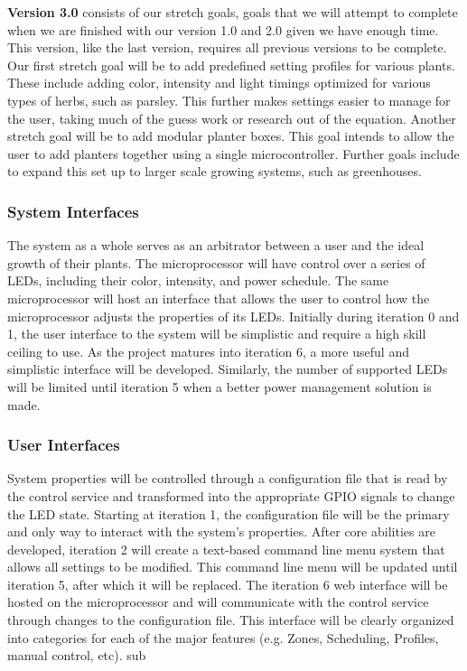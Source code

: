 \documentclass[onecolumn, draftclsnofoot,10pt, compsoc]{IEEEtran}
\begin{document}
		\noindent \textbf{Version 3.0} consists of our stretch goals, goals that we will attempt to complete when we are finished with our version 1.0 and 2.0 given we have enough time. This version, like the last version,
		requires all previous versions to be complete. Our first stretch goal will be to add predefined setting profiles for various plants. These include adding color, intensity and light timings optimized
		for various types of herbs, such as parsley. This further makes settings easier to manage for the user, taking much of the guess work or research out of the equation. Another stretch goal will be
		to add modular planter boxes. This goal intends to allow the user to add planters together using a single microcontroller. Further goals include to expand this set up to larger scale growing systems,
		such as greenhouses.


		\subsubsection*{System Interfaces}
				The system as a whole serves as an arbitrator between a user and the ideal growth of their plants.
				The microprocessor will have control over a series of LEDs, including their color, intensity, and power schedule. The same microprocessor will host an interface that allows the user to control
				how the microprocessor adjusts the properties of its LEDs. Initially during iteration 0 and 1, the user interface to the system will be simplistic and require a high skill ceiling to use. As the project matures into iteration 6, a more useful and
				simplistic interface will be developed. Similarly, the number of supported LEDs will be limited until iteration 5 when a better power management solution is made.
		 \subsubsection*{User Interfaces}
				System properties will be controlled through a configuration file that is read by the control service and transformed into the appropriate GPIO signals to change the LED state. Starting at
				iteration 1, the configuration file will be the primary and only way to interact with the system’s properties. After core abilities are developed, iteration 2 will create a text-based command
				line menu system that allows all settings to be modified. This command line menu will be updated until iteration 5, after which it will be replaced.
				The iteration 6 web interface will be hosted on the microprocessor and will communicate with the control service through changes to the configuration file. This interface will be clearly
				organized into categories for each of the major features (e.g. Zones, Scheduling, Profiles, manual control, etc).
				sub
\end{document}
